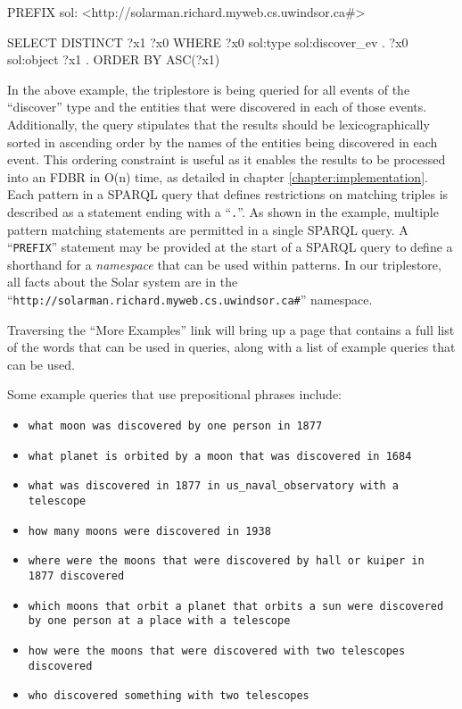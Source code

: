 \documentclass[../main.tex]{subfiles}
\begin{document}
\begin{code}
	PREFIX sol: <http://solarman.richard.myweb.cs.uwindsor.ca#>
	
	SELECT DISTINCT ?x1 ?x0 WHERE {
	?x0 sol:type sol:discover_ev .
	?x0 sol:object ?x1 .
	} ORDER BY ASC(?x1) 

\end{code}

In the above example, the triplestore is being queried for all events of the ``discover'' type and the entities that were discovered in each of those events.  Additionally,
the query stipulates that the results should be lexicographically sorted in ascending order by the names of the entities being discovered in each event.  This ordering constraint is useful
as it enables the results to be processed into an FDBR in O(n) time, as detailed in chapter \ref{chapter:implementation}.  Each pattern in a SPARQL query that defines restrictions on matching triples is described as a statement ending with a ``\texttt{.}''.  As shown in the example, multiple pattern matching statements are permitted in a single SPARQL query.  A ``\texttt{PREFIX}'' statement may be provided at the start of a SPARQL query to define a shorthand for a {\em namespace} that can be used within patterns.  In our triplestore, all facts about the Solar system are in the ``\texttt{http://solarman.richard.myweb.cs.uwindsor.ca\#}'' namespace.   %

Traversing the ``More Examples'' link will bring up a page that contains a full list of the words that can be used in queries, along with a list of example queries that can be used.

Some example queries that use prepositional phrases include:

\begin{itemize}
	\item \texttt{what moon was discovered by one person in 1877}
	\item \texttt{what planet is orbited by a moon that was discovered in 1684}
	\item \texttt{what was discovered in 1877 in us\_naval\_observatory with a \\ telescope}
	\item \texttt{how many moons were discovered in 1938}
	\item \texttt{where were the moons that were discovered by hall or kuiper in \\ 1877 discovered}
	\item \texttt{which moons that orbit a planet that orbits a sun were discovered \\ by one person at a place with a telescope}
	\item \texttt{how were the moons that were discovered with two telescopes\\ discovered}
	\item \texttt{who discovered something with two telescopes}
\end{itemize}
\end{document}
